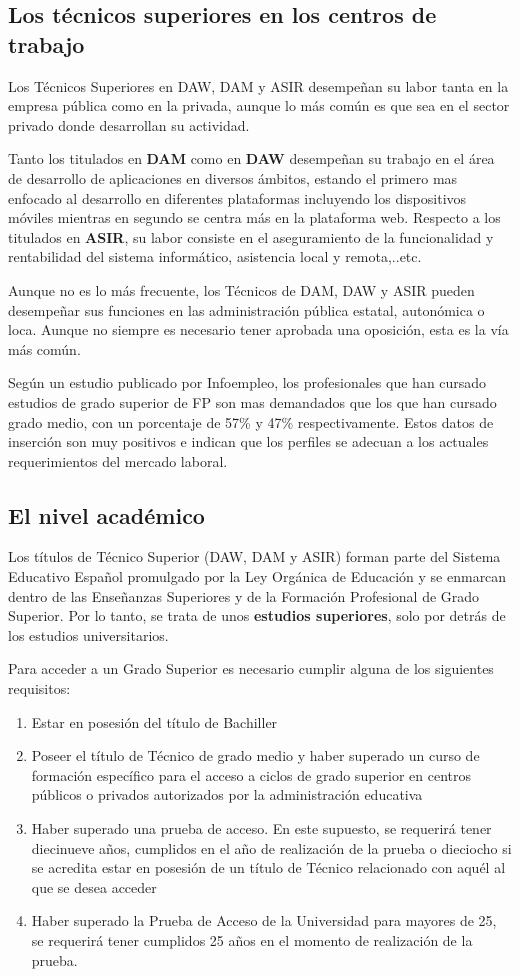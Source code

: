 \subsection{Los técnicos superiores en los centros de trabajo}
Los Técnicos Superiores en DAW, DAM y ASIR desempeñan su labor tanta en la empresa pública como en la privada, aunque lo más común es que sea en el sector privado donde desarrollan su actividad.

Tanto los titulados en \textbf{DAM} como en \textbf{DAW} desempeñan su trabajo en el área de desarrollo de aplicaciones en diversos ámbitos, estando el primero mas enfocado al desarrollo en diferentes plataformas incluyendo los dispositivos móviles mientras en segundo se centra más en la plataforma web. Respecto a los titulados en \textbf{ASIR}, su labor consiste en el aseguramiento de la funcionalidad y rentabilidad del sistema informático, asistencia local y remota,..etc.

Aunque no es lo más frecuente, los Técnicos de DAM, DAW y ASIR pueden desempeñar sus funciones en las administración pública estatal, autonómica o loca. Aunque no siempre es necesario tener aprobada una oposición, esta es la vía más común.

Según un estudio publicado por Infoempleo, los profesionales que han cursado estudios de grado superior de FP son mas demandados que los que han cursado grado medio, con un porcentaje de 57\% y 47\% respectivamente. Estos datos de inserción son muy positivos e indican que los perfiles se adecuan a los actuales requerimientos del mercado laboral.\cite{educaweb}

\subsection{El nivel académico}
Los títulos de Técnico Superior (DAW, DAM y ASIR) forman parte del Sistema Educativo Español promulgado por la Ley Orgánica de Educación y se enmarcan dentro de las Enseñanzas Superiores y de la Formación Profesional de Grado Superior. Por lo tanto, se trata de unos \textbf{estudios superiores}, solo por detrás de los estudios universitarios.

Para acceder a un Grado Superior es necesario cumplir alguna de los siguientes requisitos:
\begin{enumerate}[label={\alph*.}]
    \item Estar en posesión del título de Bachiller
    \item Poseer el título de Técnico de grado medio y haber superado un curso de formación específico para el acceso a ciclos de grado superior en centros públicos o privados autorizados por la administración educativa
    \item Haber superado una prueba de acceso. En este supuesto, se requerirá tener diecinueve años, cumplidos en el año de realización de la prueba o dieciocho si se acredita estar en posesión de un título de Técnico relacionado con aquél al que se desea acceder
    \item Haber superado la Prueba de Acceso de la Universidad para mayores de 25, se requerirá tener cumplidos 25 años en el momento de realización de la prueba.
\end{enumerate}

